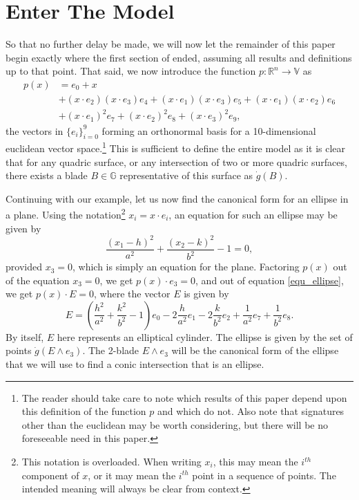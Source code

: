 \documentclass{birkjour}
\theoremstyle{definition}
\theoremstyle{remark}
\numberwithin{equation}{section}
\newcommand{\R}{\mathbb{R}}
\newcommand{\G}{\mathbb{G}}
\newcommand{\V}{\mathbb{V}}
\newcommand{\gd}{\dot{g}}
\begin{document}
\section{Enter The Model}

So that no further delay be made, we will now let the remainder of this paper begin
exactly where the first section of \cite{} ended, assuming all results and definitions up to that point.
That said, we now introduce the function $p:\R^n\to\V$ as
\begin{align*}
p(x) &= e_0 + x \\
 &+ (x\cdot e_2)(x\cdot e_3)e_4 + (x\cdot e_1)(x\cdot e_3)e_5 + (x\cdot e_1)(x\cdot e_2)e_6 \\
 &+ (x\cdot e_1)^2e_7 + (x\cdot e_2)^2e_8 + (x\cdot e_3)^2 e_9,
\end{align*}
the vectors in $\{e_i\}_{i=0}^9$ forming an orthonormal basis for a 10-dimensional
euclidean vector space.\footnote{The reader should take care to note which results of this paper
depend upon this definition of the function $p$ and which do not.  Also note that signatures
other than the euclidean may be worth considering, but there will be no foreseeable need in this paper.}
This is sufficient to define the entire model as it is clear that for any quadric
surface, or any intersection of two or more quadric surfaces, there exists a blade
$B\in\G$ representative of this surface as $\gd(B)$.

Continuing with our example, let us now find the canonical form for an ellipse
in a plane.  Using the notation\footnote{This notation is overloaded.  When writing $x_i$, this may mean
the $i^{th}$ component of $x$, or it may mean the $i^{th}$ point in a sequence of points.  The intended
meaning will always be clear from context.} $x_i = x\cdot e_i$, an equation for such an ellipse
may be given by
\begin{equation}\label{equ_ellipse}
\frac{(x_1-h)^2}{a^2} + \frac{(x_2-k)^2}{b^2} - 1 = 0,
\end{equation}
provided $x_3=0$, which is simply an equation for the plane.
Factoring $p(x)$ out of the equation $x_3=0$, we get $p(x)\cdot e_3=0$,
and out of equation \eqref{equ_ellipse}, we get $p(x)\cdot E=0$, where the
vector $E$ is given by
\begin{equation*}
E = \left(\frac{h^2}{a^2} + \frac{k^2}{b^2} - 1\right)e_0 -
  2\frac{h}{a^2}e_1 - 2\frac{k}{b^2}e_2 + \frac{1}{a^2}e_7 + \frac{1}{b^2}e_8.
\end{equation*}
By itself, $E$ here represents an elliptical cylinder.  The ellipse is given by
the set of points $\gd(E\wedge e_3)$.  The 2-blade $E\wedge e_3$ will be the
canonical form of the ellipse that we will use to find a conic intersection that
is an ellipse.
\end{document}
